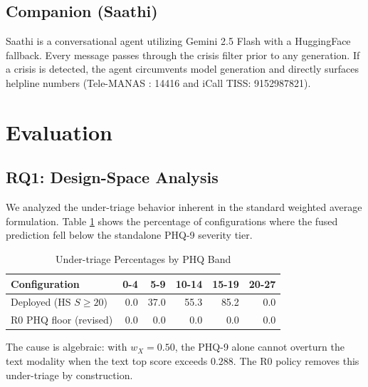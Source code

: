 \documentclass[conference]{IEEEtran}
\begin{document}
\subsection{Companion (Saathi)}
Saathi is a conversational agent utilizing Gemini 2.5 Flash \cite{google_gemini} with a HuggingFace fallback. Every message passes through the crisis filter prior to any generation. If a crisis is detected, the agent circumvents model generation and directly surfaces helpline numbers (Tele-MANAS \cite{tele_manas}: 14416 and iCall TISS: 9152987821).

\section{Evaluation}

\subsection{RQ1: Design-Space Analysis}
We analyzed the under-triage behavior inherent in the standard weighted average formulation. Table \ref{tab:under_triage} shows the percentage of configurations where the fused prediction fell below the standalone PHQ-9 severity tier. 
\begin{table}[htbp]
\caption{Under-triage Percentages by PHQ Band}
\label{tab:under_triage}
\centering
\begin{tabular}{lrrrrr}
\toprule
\textbf{Configuration} & \textbf{0-4} & \textbf{5-9} & \textbf{10-14} & \textbf{15-19} & \textbf{20-27} \\
\midrule
Deployed (HS $S\geq20$) & 0.0 & 37.0 & 55.3 & 85.2 & 0.0 \\
R0 PHQ floor (revised) & 0.0 & 0.0 & 0.0 & 0.0 & 0.0 \\
\bottomrule
\end{tabular}
\end{table}
The cause is algebraic: with $w_X=0.50$, the PHQ-9 alone cannot overturn the text modality when the text top score exceeds $0.288$. The R0 policy removes this under-triage by construction.
\end{document}

